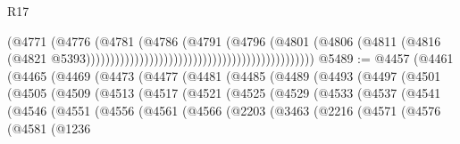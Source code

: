 \begin{lexlean}{R17}
\begin{coremodule}
                                                                            (@4771
                                                                              (@4776
                                                                                (@4781
                                                                                  (@4786
                                                                                    (@4791
                                                                                      (@4796
                                                                                        (@4801
                                                                                          (@4806
                                                                                            (@4811
                                                                                              (@4816
                                                                                                (@4821
                                                                                                  @5393)))))))))))))))))))))))))))))))))))))))))))))))
@5489 := @4457
    (@4461
      (@4465
        (@4469
          (@4473
            (@4477
              (@4481
                (@4485
                  (@4489
                    (@4493
                      (@4497
                        (@4501
                          (@4505
                            (@4509
                              (@4513
                                (@4517
                                  (@4521
                                    (@4525
                                      (@4529
                                        (@4533
                                          (@4537
                                            (@4541
                                              (@4546
                                                (@4551
                                                  (@4556
                                                    (@4561
                                                      (@4566
                                                        (@2203
                                                          (@3463
                                                            (@2216
                                                              (@4571
                                                                (@4576
                                                                  (@4581
                                                                    (@1236

\end{coremodule}
\end{lexlean}
